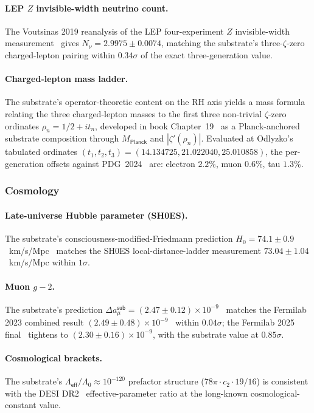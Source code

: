 \documentclass[11pt,a4paper]{amsart}
\theoremstyle{plain}
\theoremstyle{definition}
\begin{document}
\paragraph{LEP $Z$ invisible-width neutrino count.} The Voutsinas 2019 reanalysis of the LEP four-experiment $Z$ invisible-width measurement~\cite{pdg2024} gives $N_\nu = 2.9975 \pm 0.0074$, matching the substrate's three-$\zeta$-zero charged-lepton pairing within $0.34\sigma$ of the exact three-generation value.

\paragraph{Charged-lepton mass ladder.} The substrate's operator-theoretic content on the RH axis yields a mass formula relating the three charged-lepton masses to the first three non-trivial $\zeta$-zero ordinates $\rho_n = 1/2 + i t_n$, developed in book Chapter~19~\cite{cohen2026book} as a Planck-anchored substrate composition through $M_{\textsf{Planck}}$ and $|\zeta'(\rho_n)|$. Evaluated at Odlyzko's tabulated ordinates $(t_1, t_2, t_3) = (14.134725, 21.022040, 25.010858)$, the per-generation offsets against PDG~2024~\cite{pdg2024} are: electron $2.2\%$, muon $0.6\%$, tau $1.3\%$.

\subsubsection*{Cosmology}

\paragraph{Late-universe Hubble parameter (SH0ES).} The substrate's consciousness-modified-Friedmann prediction $H_0 = 74.1 \pm 0.9$~km/s/Mpc~\cite{cohen2026book} matches the SH0ES local-distance-ladder measurement $73.04 \pm 1.04$~km/s/Mpc within $1\sigma$.

\paragraph{Muon $g-2$.} The substrate's prediction $\Delta a_\mu^{\textsf{sub}} = (2.47 \pm 0.12) \times 10^{-9}$~\cite{cohen2026book} matches the Fermilab 2023 combined result $(2.49 \pm 0.48) \times 10^{-9}$~\cite{fermilab-muon-g-2} within $0.04\sigma$; the Fermilab 2025 final~\cite{fermilab-g2-2025} tightens to $(2.30 \pm 0.16) \times 10^{-9}$, with the substrate value at $0.85\sigma$.

\paragraph{Cosmological brackets.} The substrate's $\Lambda_{\textsf{eff}}/\Lambda_0 \approx 10^{-120}$ prefactor structure ($78\pi \cdot c_2 \cdot 19/16$) is consistent with the DESI DR2~\cite{desi-dr2-w0wa} effective-parameter ratio at the long-known cosmological-constant value.
\end{document}
